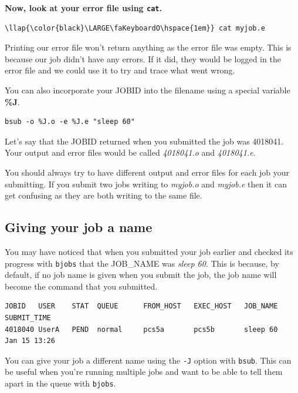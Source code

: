 \documentclass[11pt]{article}
\begin{document}
    \textbf{Now, look at your error file using \texttt{cat}.}

\begin{terminalinput}
\begin{Verbatim}[commandchars=\\\{\}]
\llap{\color{black}\LARGE\faKeyboardO\hspace{1em}} cat myjob.e
\end{Verbatim}
\end{terminalinput}


    Printing our error file won't return anything as the error file was
empty. This is because our job didn't have any errors. If it did, they
would be logged in the error file and we could use it to try and trace
what went wrong.

    You can also incorporate your JOBID into the filename using a special
variable \textbf{\%J}.

    \begin{verbatim}
bsub -o %J.o -e %J.e "sleep 60"
\end{verbatim}

    Let's say that the JOBID returned when you submitted the job was
4018041. Your output and error files would be called \textit{4018041.o}
and \textit{4018041.e}.

You should always try to have different output and error files for each
job your submitting. If you submit two jobs writing to \textit{myjob.o}
and \textit{myjob.e} then it can get confusing as they are both writing to
the same file.

    \subsection{Giving your job a name}\label{giving-your-job-a-name}

You may have noticed that when you submitted your job earlier and
checked its progress with \texttt{bjobs} that the JOB\_NAME was
\textit{sleep 60}. This is because, by default, if no job name is given
when you submit the job, the job name will become the command that you
submitted.

    \begin{verbatim}
JOBID   USER    STAT  QUEUE      FROM_HOST   EXEC_HOST   JOB_NAME   SUBMIT_TIME
4018040 UserA   PEND  normal     pcs5a       pcs5b       sleep 60   Jan 15 13:26
\end{verbatim}

    You can give your job a different name using the \texttt{-J} option with
\texttt{bsub}. This can be useful when you're running multiple jobs and
want to be able to tell them apart in the queue with \texttt{bjobs}.
\end{document}
